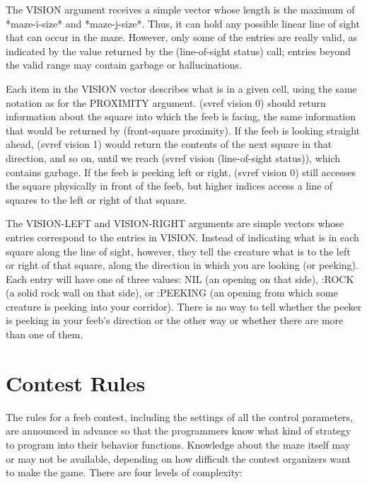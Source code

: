 \documentclass[12pt]{article}
\begin{document}
The VISION argument receives a simple vector whose length is the
maximum of *maze-i-size* and *maze-j-size*.  Thus, it can hold any
possible linear line of sight that can occur in the maze.  However,
only some of the entries are really valid, as indicated by the value
returned by the (line-of-sight status) call; entries beyond the valid
range may contain garbage or hallucinations.

Each item in the VISION vector describes what is in a given cell,
using the same notation as for the PROXIMITY argument.  (svref vision
0) should return information about the square into which the feeb is
facing, the same information that would be returned by (front-square
proximity).  If the feeb is looking straight ahead, (svref vision 1)
would return the contents of the next square in that direction, and so
on, until we reach (svref vision (line-of-sight status)), which
contains garbage.  If the feeb is peeking left or right, (svref vision
0) still accesses the square physically in front of the feeb, but
higher indices access a line of squares to the left or right of that
square.

The VISION-LEFT and VISION-RIGHT arguments are simple vectors whose
entries correspond to the entries in VISION.  Instead of indicating what
is in each square along the line of sight, however, they tell the
creature what is to the left or right of that square, along the
direction in which you are looking (or peeking).  Each entry will have
one of three values: NIL (an opening on that side), :ROCK (a solid rock
wall on that side), or :PEEKING (an opening from which some creature is
peeking into your corridor).  There is no way to tell whether the peeker
is peeking in your feeb's direction or the other way or whether there are
more than one of them.

\section{Contest Rules}

The rules for a feeb contest, including the settings of all the control
parameters, are announced in advance so that the programmers know what
kind of strategy to program into their behavior functions.  Knowledge
about the maze itself may or may not be available, depending on how
difficult the contest organizers want to make the game.  There are four
levels of complexity:
\end{document}
